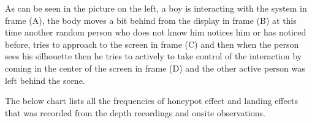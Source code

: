 As can be seen in the picture on the left, a boy is interacting with the system in frame (A), the body moves a bit behind from the display in frame (B) at this time another random person who does not know him notices him or has noticed before, tries to approach to the screen in frame (C) and then when the person sees his silhouette then he tries to actively to take control of the interaction by coming in the center of the screen in frame (D) and the other active person was left behind the scene.

The below chart lists all the frequencies of honeypot effect and landing effects that was recorded from the depth recordings and onsite observations. \\



\begin{minipage}{\textwidth}
\begin{flushright} 
\begin{table}[H]
\caption{Landing and honeypot effects}
\label{tab:landingandhonypot_body}
\centering
{}
\end{table}
\end{flushright} 
\end{minipage}



